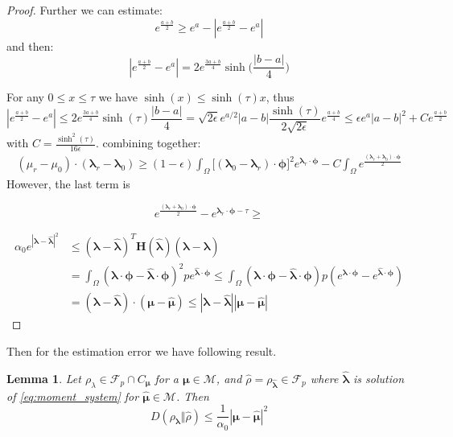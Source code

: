 \documentclass{article}
\newtheorem{lemma}[theorem]{Lemma}
\def\vc#1{\mathbf{\boldsymbol{#1}}}     %
\def\tn#1{\boldsymbol{#1}}
\def\abs#1{|#1|}
\def\vl{{\vc\lambda}}
\def\estvl{{\vc{\hat\lambda}}}
\def\estrho{\hat\rho}
\def\vmu{\vc\mu}
\def\estvmu{{\vc{\hat\mu}}}
\def\vphi{\vc\phi}
\begin{document}
\begin{proof}
Further we can estimate:
\[
    e^\frac{a + b}{2} \ge e^{a} - \abs{e^\frac{a + b}{2} - e^{a}}
\]
and then:
\[
 \abs{e^\frac{a + b}{2} - e^{a}} = 2e^\frac{3a+b}{4} \sinh\Big(\frac{|b-a|}{4}\Big)
\]

For any $0 \le x \le \tau$ we have $\sinh(x) \le \sinh(\tau) x$, thus
\[
 \abs{e^\frac{a + b}{2} - e^{a}} \le 2e^\frac{3a+b}{4} \sinh(\tau) \frac{|b-a|}{4}
 =  \sqrt{2\epsilon} e^{a/2}|a-b| \frac{\sinh(\tau)}{2\sqrt{2\epsilon}} e^{\frac{a+b}{4}}  \le 
    \epsilon e^{a}|a-b|^2 +  C e^{\frac{a+b}{2}}
\]
with $C = \frac{\sinh^2(\tau)}{16\epsilon}$.
combining together:
\begin{align*}
 (\mu_r - \mu_0) \cdot (\vl_r - \vl_0) 
 \ge (1-\epsilon)\int_\Omega  \big[ (\vl_0 - \vl_r) \cdot \vphi \big]^2 e^{\vl_r \cdot \vphi}
 -C \int_\Omega e^\frac{(\vl_r + \vl_0) \cdot \vphi}{2}
\end{align*}
However, the last term is 











\[
 e^\frac{(\vl_r + \vl_0) \cdot \vphi}{2} - e^{\vl_r\cdot\vphi-\tau} \ge 
\]





\begin{align*}
  \alpha_0 e^\abs{\vl - \estvl}^2 &\le  (\vl-\estvl)^T\tn H(\estvl)(\vl -\estvl)\\
  &= \int_\Omega (\vl\cdot\vphi  - \estvl\cdot\vphi)^2 pe^{\estvl\cdot\vphi}
  \le \int_{\Omega} (\vl\cdot\vphi - \estvl\cdot\vphi) 
  p(e^{\vl\cdot\vphi} - e^{\estvl\cdot\vphi})\\
  &=  (\vl - \estvl)\cdot(\vmu - \estvmu) \le \abs{\vl - \estvl}\abs{\vmu - \estvmu}
\end{align*}
\end{proof}




Then for the estimation error we have following result.
\begin{lemma}
  \label{thm:est_error}
  Let $\rho_\lambda \in \mathcal F_p \cap C_{\vmu}$ for a $\vmu \in \mathcal M$, 
  and $\estrho = \rho_{\estvl}\in \mathcal F_p$ 
  where $\estvl$ is solution of \eqref{eq:moment_system} for $\estvmu \in \mathcal M$. Then 
  \[
    D(\rho_{\vl}\Vert \estrho) \le \frac{1}{\alpha_0} \abs{\vmu - \estvmu}^2
  \]
\end{lemma}
\end{document}
